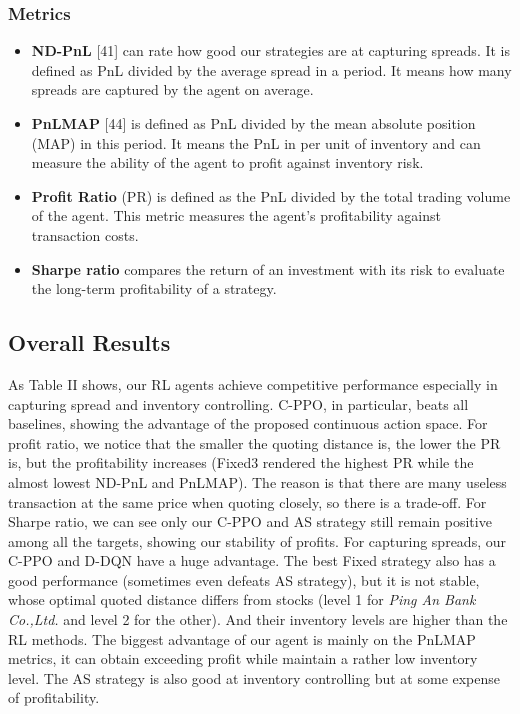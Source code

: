 \documentclass[conference]{IEEEtran}
\begin{document}
\subsubsection{Metrics}
\begin{itemize}
    \item \textbf{ND-PnL} [41] can rate how good our strategies are at capturing spreads. It is defined as PnL divided by the average spread in a period. It means how many spreads are captured by the agent on average.
    \item \textbf{PnLMAP} [44] is defined as PnL divided by the mean absolute position (MAP) in this period. It means the PnL in per unit of inventory and can measure the ability of the agent to profit against inventory risk.
    \item \textbf{Profit Ratio} (PR) is defined as the PnL divided by the total trading volume of the agent. This metric measures the agent's profitability against transaction costs.
    \item \textbf{Sharpe ratio} compares the return of an investment with its risk to evaluate the long-term profitability of a strategy.
\end{itemize}

\subsection{Overall Results}
As Table II shows, our RL agents achieve competitive performance especially in capturing spread and inventory controlling. C-PPO, in particular, beats all baselines, showing the advantage of the proposed continuous action space. For profit ratio, we notice that the smaller the quoting distance is, the lower the PR is, but the profitability increases (Fixed3 rendered the highest PR while the almost lowest ND-PnL and PnLMAP). The reason is that there are many useless transaction at the same price when quoting closely, so there is a trade-off. For Sharpe ratio, we can see only our C-PPO and AS strategy still remain positive among all the targets, showing our stability of profits. For capturing spreads, our C-PPO and D-DQN have a huge advantage. The best Fixed strategy also has a good performance (sometimes even defeats AS strategy), but it is not stable, whose optimal quoted distance differs from stocks (level 1 for \textit{Ping An Bank Co.,Ltd.} and level 2 for the other). And their inventory levels are higher than the RL methods. The biggest advantage of our agent is mainly on the PnLMAP metrics, it can obtain exceeding profit while maintain a rather low inventory level. The AS strategy is also good at inventory controlling but at some expense of profitability.
\end{document}

